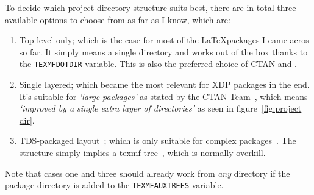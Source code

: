 \documentclass{xdpdoc}
\begin{document}
\begin{multicols}{2}
        To decide which project directory structure suits best, there are in total three available options to choose from as far as I know, which are:
        \begin{enumerate}
            \item Top-level only; which is the case for most of the \LaTeX packages I came acros so far.
            It simply means a single directory and works out of the box thanks to the \texttt{TEXMFDOTDIR} variable.
            This is also the preferred choice of CTAN and \TeXLive.
            \item Single layered; which became the most relevant for XDP packages in the end.
            It's suitable for \textit{`large packages'} as stated by the CTAN Team~\cite{ctan:help:upload},
            which means \textit{`improved by a single extra layer of directories'} as seen in figure~\ref{fig:project dir}.
            \item TDS-packaged layout~\cite{ctan:help:tds}; which is only suitable for complex packages~\cite{texlive-packaging}.
            The structure simply implies a texmf tree~\cite{tds}, which is normally overkill.
        \end{enumerate}
        Note that cases one and three should already work from \textit{any} directory if the package directory is added to the \texttt{TEXMFAUXTREES} variable.

\end{multicols}
\end{document}
